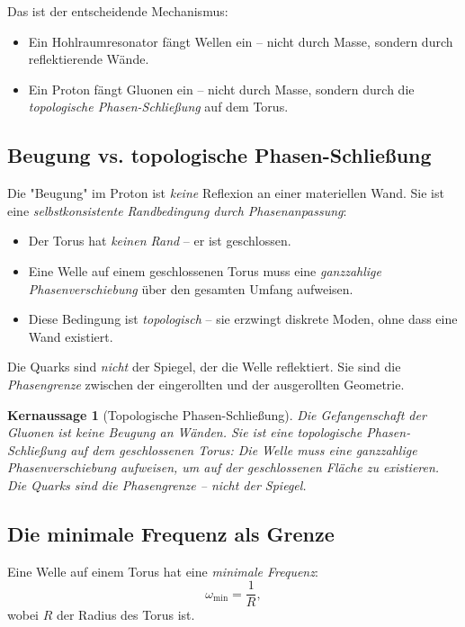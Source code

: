 \documentclass[11pt,a4paper]{article}
\newtheorem{keyresult}{Kernaussage}
\begin{document}
	Das ist der entscheidende Mechanismus:
	\begin{itemize}
		\item Ein Hohlraumresonator fängt Wellen ein -- nicht durch Masse, sondern durch reflektierende Wände.
		\item Ein Proton fängt Gluonen ein -- nicht durch Masse, sondern durch die \emph{topologische Phasen-Schließung} auf dem Torus.
	\end{itemize}
	
	\subsection{Beugung vs. topologische Phasen-Schließung}
	
	Die "Beugung" im Proton ist \emph{keine} Reflexion an einer materiellen Wand. 
	Sie ist eine \emph{selbstkonsistente Randbedingung durch Phasenanpassung}:
	\begin{itemize}
		\item Der Torus hat \emph{keinen Rand} -- er ist geschlossen.
		\item Eine Welle auf einem geschlossenen Torus muss eine \emph{ganzzahlige Phasenverschiebung} über den gesamten Umfang aufweisen.
		\item Diese Bedingung ist \emph{topologisch} -- sie erzwingt diskrete Moden, ohne dass eine Wand existiert.
	\end{itemize}
	
	Die Quarks sind \emph{nicht} der Spiegel, der die Welle reflektiert. 
	Sie sind die \emph{Phasengrenze} zwischen der eingerollten und der ausgerollten Geometrie.
	
	\begin{keyresult}[Topologische Phasen-Schließung]
		Die Gefangenschaft der Gluonen ist keine Beugung an Wänden. 
		Sie ist eine \emph{topologische Phasen-Schließung} auf dem geschlossenen Torus: 
		Die Welle muss eine ganzzahlige Phasenverschiebung aufweisen, um auf der geschlossenen Fläche zu existieren. 
		Die Quarks sind die Phasengrenze -- nicht der Spiegel.
	\end{keyresult}
	
	\subsection{Die minimale Frequenz als Grenze}
	
	Eine Welle auf einem Torus hat eine \emph{minimale Frequenz}:
	\[
	\omega_{\min} = \frac{1}{R},
	\]
	wobei \(R\) der Radius des Torus ist.
	
\end{document}
